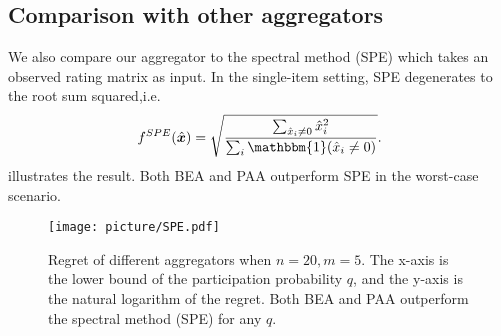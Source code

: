 \subsection{Comparison with other aggregators}

We also compare our aggregator to the spectral method (SPE) \cite{xiao2017score} which takes an observed rating matrix as input. In the single-item setting, SPE degenerates to the root sum squared,i.e.
$$
    f^{SPE}(\hat{\vx})=\sqrt{\frac{\sum_{\hat{x}_i\neq 0}{\hat{x}_i^2}}{\sum_i \mathbbm{1}(\hat{x}_i\neq 0)}}.
$$
 illustrates the result. Both BEA and PAA outperform SPE in the worst-case scenario.

\begin{figure}[h]
  \centering
  \texttt{[image: picture/SPE.pdf]}
  \caption{Regret of different aggregators when $n=20, m=5$. The x-axis is the lower bound of the participation probability $q$, and the y-axis is the natural logarithm of the regret. Both BEA and PAA outperform the spectral method (SPE) for any $q$.}
  \label{fig:SPE}
\end{figure}



